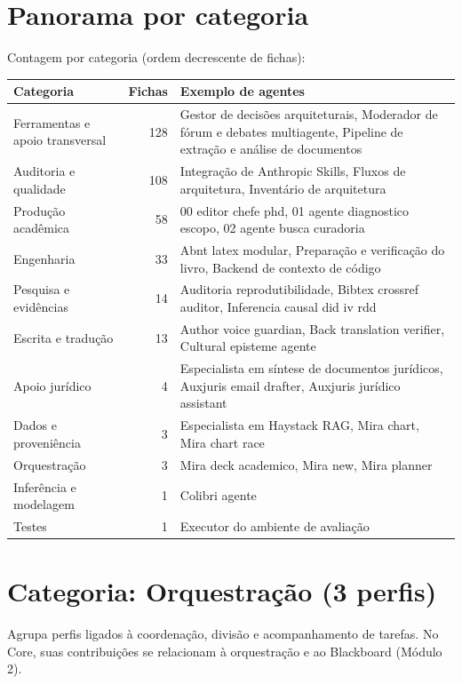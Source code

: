 \section{Panorama por categoria}

\begin{resultado}
Contagem por categoria (ordem decrescente de fichas):\par
\smallskip
{\footnotesize
\begin{tabularx}{\linewidth}{lrX}
\toprule
Categoria & Fichas & Exemplo de agentes \\
\midrule
Ferramentas e apoio transversal & 128 & Gestor de decisões arquiteturais, Moderador de fórum e debates multiagente, Pipeline de extração e análise de documentos \\
Auditoria e qualidade & 108 & Integração de Anthropic Skills, Fluxos de arquitetura, Inventário de arquitetura \\
Produção acadêmica & 58 & 00 editor chefe phd, 01 agente diagnostico escopo, 02 agente busca curadoria \\
Engenharia & 33 & Abnt latex modular, Preparação e verificação do livro, Backend de contexto de código \\
Pesquisa e evidências & 14 & Auditoria reprodutibilidade, Bibtex crossref auditor, Inferencia causal did iv rdd \\
Escrita e tradução & 13 & Author voice guardian, Back translation verifier, Cultural episteme agente \\
Apoio jurídico & 4 & Especialista em síntese de documentos jurídicos, Auxjuris email drafter, Auxjuris jurídico assistant \\
Dados e proveniência & 3 & Especialista em Haystack RAG, Mira chart, Mira chart race \\
Orquestração & 3 & Mira deck academico, Mira new, Mira planner \\
Inferência e modelagem & 1 & Colibri agente \\
Testes & 1 & Executor do ambiente de avaliação \\
\bottomrule
\end{tabularx}\par}
\end{resultado}

\clearpage
\section{Categoria: Orquestração (3 perfis)}

\begin{descricao}
Agrupa perfis ligados à coordenação, divisão e acompanhamento de tarefas. No Core, suas contribuições se relacionam à orquestração e ao Blackboard (Módulo 2).
\end{descricao}

